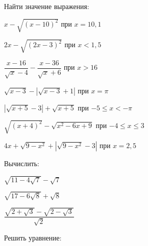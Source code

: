 \begin{enumcols}[label=\textbf{\arabic*.}]
	\item Найти значение выражения:
	\begin{enumcols}[itemcolumns=2]
		\item \( x-\sqrt{(x-10)^2} \)\hspace{0,2cm} при \( x=10,1 \)
		\item \( 2x-\sqrt{(2x-3)^2} \)\hspace{0,2cm} при \( x<1,5\)
		\item \( \dfrac{x-16}{\sqrt{x}-4}-\dfrac{x-36}{\sqrt{x}+6} \)\hspace{0,5cm} при \( x>16 \)
		\item \( \sqrt{x-3}-|\sqrt{x-3}+1| \)\hspace{0,2cm} при \( x=\pi\)
		\item \( |\sqrt{x+5}-3|+\sqrt{x+5} \)\hspace{0,2cm} при \( -5\le x< -\pi\)
		\item \( \sqrt{(x+4)^2}-\sqrt{x^2-6x+9} \)\hspace{0,2cm} при \( -4\le x \le 3\)
		\item \( 4x+\sqrt{9-x^2}+|\sqrt{9-x^2}-3| \)\hspace{0,2cm} при \( x=2,5\)
	\end{enumcols}
	\item Вычислить:
	\begin{enumcols}[itemcolumns=3]
		\item \( \sqrt{11-4\sqrt{7}}-\sqrt{7} \)
		\item \( \sqrt{17-6\sqrt{8}}+\sqrt{8} \)
		\item \( \dfrac{\sqrt{2+\sqrt{3}}-\sqrt{2-\sqrt{3}}}{\sqrt{2}} \)
	\end{enumcols}
	\item Решить уравнение:
	\begin{enumcols}[itemcolumns=2]
		\item {}
		\item {}
		\item {}
		\item {}
		\item {}
	\end{enumcols}
\end{enumcols}